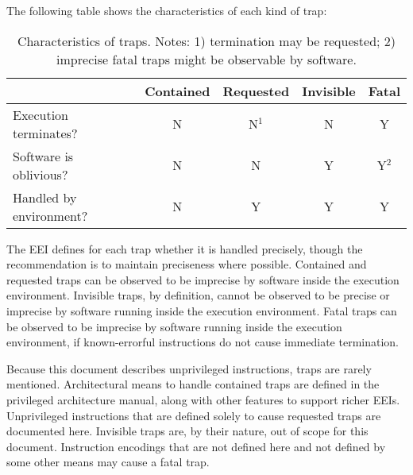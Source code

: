 The following table shows the characteristics of each kind of trap:

\begin{table}[hbt]
  \centering
  \begin{tabular}{|l|c|c|c|c|}
      \hline
      & Contained & Requested & Invisible & Fatal\\
      \hline
      Execution terminates? & N & N$^{1}$ & N & Y \\
      Software is oblivious? & N & N & Y & Y$^{2}$ \\
      Handled by environment? & N & Y & Y & Y \\
      \hline
  \end{tabular}
  \caption{Characteristics of traps. Notes: 1) termination may be
    requested; 2) imprecise fatal traps might be observable by software.}
\end{table}

The EEI defines for each trap whether it is handled precisely, though
the recommendation is to maintain preciseness where possible.
Contained and requested traps can be observed to be imprecise by
software inside the execution environment.  Invisible traps, by
definition, cannot be observed to be precise or imprecise by software
running inside the execution environment.  Fatal traps can be observed
to be imprecise by software running inside the execution environment,
if known-errorful instructions do not cause immediate termination.

Because this document describes unprivileged instructions, traps are
rarely mentioned.  Architectural means to handle contained traps are
defined in the privileged architecture manual, along with other
features to support richer EEIs.  Unprivileged instructions that are
defined solely to cause requested traps are documented here.
Invisible traps are, by their nature, out of scope for this document.
Instruction encodings that are not defined here and not defined by
some other means may cause a fatal trap.
